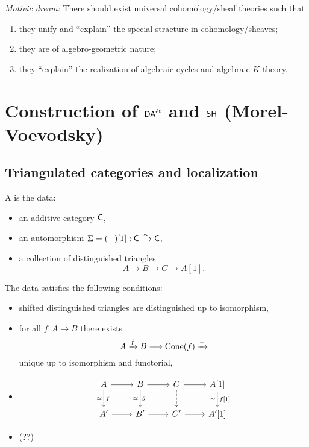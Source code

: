 \emph{Motivic dream:} There should exist universal cohomology/sheaf theories such that
\begin{enumerate}[1)]
	\item they unify and ``explain'' the special stracture in cohomology/sheaves;
	\item they are of algebro-geometric nature;
	\item they ``explain'' the realization of algebraic cycles and algebraic $K$-theory.
\end{enumerate}

\section{Construction of \texorpdfstring{$\mathsf{DA}^\text{\'et}$}{DA\'et} and \texorpdfstring{$\mathsf{SH}$}{SH} (Morel-Voevodsky)}
\subsection{Triangulated categories and localization}
\begin{definition}
	A  is the data:
	\begin{itemize}
		\item an additive category $\mathsf{C}$,
		\item an automorphism $\Sigma=(-)[1]:\mathsf{C}\xrightarrow{\sim} \mathsf{C}$,
		\item a collection of distinguished triangles
			\[
				A \to B \to C \to A[1]
			.\] 
	\end{itemize}
	The data satisfies the following conditions:
	\begin{itemize}
		\item shifted distinguished triangles are distinguished up to isomorphism,
		\item for all $f:A\to B$ there exists
			\[
				A \xrightarrow{f} B \to \Cone(f) \xrightarrow{+}
			\] 
			unique up to isomorphism and functorial,
		\item 
			\begin{equation*}
			\begin{tikzcd}
				A \ar[r] \ar[d,"f","\simeq"'] & B \ar[r] \ar[d,"g","\simeq"'] & C \ar[d,dashed] \ar[r] & A[1] \ar[d,"{f[1]}","\simeq"'] \\
				A' \ar[r] & B' \ar[r] & C' \ar[r] & A'[1]
			\end{tikzcd}
			\end{equation*}	
		\item (??)
	\end{itemize}
\end{definition}

